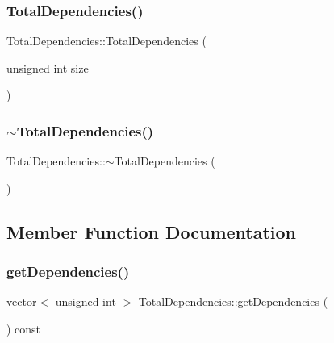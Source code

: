 \subsubsection{\texorpdfstring{Total\+Dependencies()}{TotalDependencies()}\hspace{0.1cm}{\footnotesize\ttfamily [3/3]}}
{\footnotesize\ttfamily Total\+Dependencies\+::\+Total\+Dependencies (\begin{DoxyParamCaption}\item[{unsigned int}]{size }\end{DoxyParamCaption})}

\mbox{\label{class_total_dependencies_a960e7c1a6ca7a552cc36fb0bd1244d23}} 
\subsubsection{\texorpdfstring{$\sim$\+Total\+Dependencies()}{~TotalDependencies()}}
{\footnotesize\ttfamily Total\+Dependencies\+::$\sim$\+Total\+Dependencies (\begin{DoxyParamCaption}{ }\end{DoxyParamCaption})\hspace{0.3cm}{\ttfamily [virtual]}}



\subsection{Member Function Documentation}
\mbox{\label{class_total_dependencies_a43a89fb00be27b354a4df86f6c3c8b6e}} 
\subsubsection{\texorpdfstring{get\+Dependencies()}{getDependencies()}}
{\footnotesize\ttfamily vector$<$ unsigned int $>$ Total\+Dependencies\+::get\+Dependencies (\begin{DoxyParamCaption}{ }\end{DoxyParamCaption}) const}


